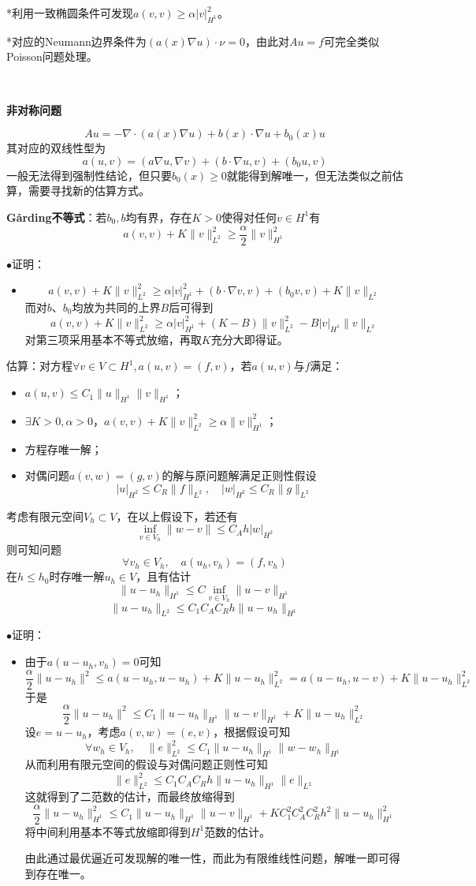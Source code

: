 \documentclass[a4paper,UTF8,fontset=windows]{ctexart}
\newcommand{\proo}[1]{{\kaishu $\bullet$证明：
\begin{itemize}
    \item[] #1
\end{itemize}
}}
\begin{document}
*利用一致椭圆条件可发现$a(v,v)\ge\alpha|v|_{H^1}^2$。

*对应的Neumann边界条件为$(a(x)\nabla u)\cdot\nu=0$，由此对$Au=f$可完全类似Poisson问题处理。

\

\textbf{非对称问题}

$$Au=-\nabla\cdot(a(x)\nabla u)+b(x)\cdot\nabla u+b_0(x)u$$
其对应的双线性型为
$$a(u,v)=(a\nabla u,\nabla v)+(b\cdot\nabla u,v)+(b_0u,v)$$
一般无法得到强制性结论，但只要$b_0(x)\ge0$就能得到解唯一，但无法类似之前估算，需要寻找新的估算方式。

\textbf{G\r{a}rding不等式}：若$b_0,b$均有界，存在$K>0$使得对任何$v\in H^1$有
$$a(v,v)+K\|v\|_{L^2}^2\ge\frac{\alpha}{2}\|v\|_{H^1}^2$$
\proo{
    $$a(v,v)+K\|v\|_{L^2}^2\ge\alpha|v|_{H^1}^2+(b\cdot\nabla v,v)+(b_0v,v)+K\|v\|_{L^2}$$
    而对$b$、$b_0$均放为共同的上界$B$后可得到
    $$a(v,v)+K\|v\|_{L^2}^2\ge\alpha|v|_{H^1}^2+(K-B)\|v\|_{L^2}^2-B|v|_{H^1}\|v\|_{L^2}$$
    对第三项采用基本不等式放缩，再取$K$充分大即得证。
}

估算：对方程$\forall v\in V\subset H^1,a(u,v)=(f,v)$，若$a(u,v)$与$f$满足：
\begin{itemize}
    \item $a(u,v)\le C_1\|u\|_{H^1}\|v\|_{H^1}$；
    \item $\exists K>0,\alpha>0$，$a(v,v)+K\|v\|_{L^2}^2\ge\alpha\|v\|_{H^1}^2$；
    \item 方程存唯一解；
    \item 对偶问题$a(v,w)=(g,v)$的解与原问题解满足正则性假设
    $$|u|_{H^2}\le C_R\|f\|_{L^2},\quad|w|_{H^2}\le C_R\|g\|_{L^2}$$
\end{itemize}

考虑有限元空间$V_h\subset V$，在以上假设下，若还有
$$\inf_{v\in V_h}\|w-v\|\le C_Ah|w|_{H^2}$$
则可知问题
$$\forall v_h\in V_h,\quad a(u_h,v_h)=(f,v_h)$$
在$h\le h_0$时存唯一解$u_h\in V$，且有估计
$$\|u-u_h\|_{H^1}\le C\inf_{v\in V_h}\|u-v\|_{H^1}$$
$$\|u-u_h\|_{L^2}\le C_1C_AC_Rh\|u-u_h\|_{H^1}$$
\proo{
    由于$a(u-u_h,v_h)=0$可知
    $$\frac{\alpha}{2}\|u-u_h\|^2\le a(u-u_h,u-u_h)+K\|u-u_h\|_{L^2}^2=a(u-u_h,u-v)+K\|u-u_h\|_{L^2}^2$$
    于是
    $$\frac{\alpha}{2}\|u-u_h\|^2\le C_1\|u-u_h\|_{H^1}\|u-v\|_{H^1}+K\|u-u_h\|_{L^2}^2$$
    设$e=u-u_h$，考虑$a(v,w)=(e,v)$，根据假设可知
    $$\forall w_h\in V_h,\quad\|e\|_{L^2}^2\le C_1\|u-u_h\|_{H^1}\|w-w_h\|_{H^1}$$
    从而利用有限元空间的假设与对偶问题正则性可知
    $$\|e\|_{L^2}^2\le C_1C_AC_Rh\|u-u_h\|_{H^1}\|e\|_{L^2}$$
    这就得到了二范数的估计，而最终放缩得到
    $$\frac{\alpha}{2}\|u-u_h\|_{H^1}^2\le C_1\|u-u_h\|_{H^1}\|u-v\|_{H^1}+KC_1^2C_A^2C_R^2h^2\|u-u_h\|_{H^1}^2$$
    将中间利用基本不等式放缩即得到$H^1$范数的估计。

    由此通过最优逼近可发现解的唯一性，而此为有限维线性问题，解唯一即可得到存在唯一。
}
\end{document}
